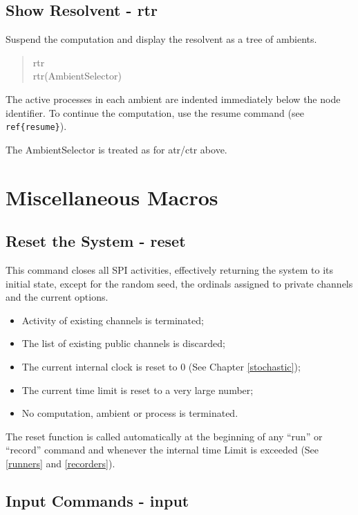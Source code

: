 \subsection{Show Resolvent - rtr}
\label{rtr}

Suspend the computation and display the resolvent as a tree of ambients.

\begin{verse}
   rtr \\
   rtr(AmbientSelector)
\end{verse}

\noindent
The active processes in each ambient are indented immediately below 
the node identifier.
To continue the computation, use the resume command
(see \verb+ ref{resume}+).

\noindent
The AmbientSelector is treated as for atr/ctr above.

\section{Miscellaneous Macros}

\subsection{Reset the System - reset}
\label{reset}

This command closes all SPI activities,
effectively returning the system to its initial state,
except for the random seed, the ordinals assigned to
private channels and the current options.

\begin{itemize}
\item Activity of existing channels is terminated;
\item The list of existing public channels is discarded;
\item The current internal clock is reset to 0
      (See Chapter \ref{stochastic});
\item The current time limit is reset to a very large number;
\item No computation, ambient or process is terminated.
\end{itemize}

\noindent
The reset function is called automatically at the beginning of
any ``run'' or ``record'' command and whenever the internal
time Limit is exceeded
(See \ref{runners} and  \ref{recorders}).

\subsection{Input Commands - input}

